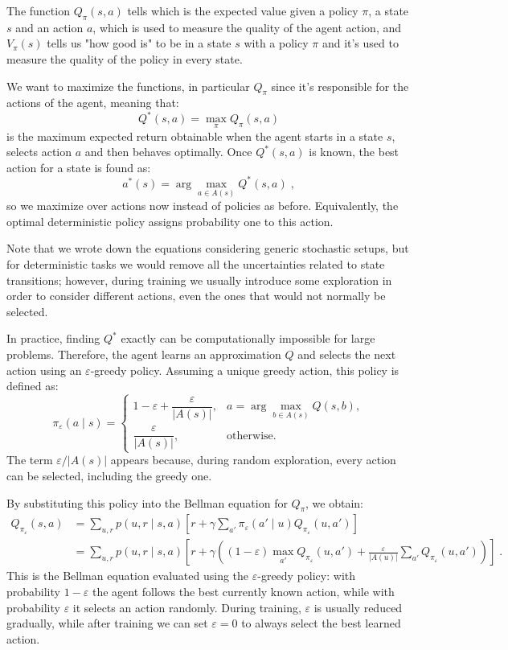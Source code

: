 \documentclass[12pt,a4paper]{article}
\begin{document}
The function $Q_\pi(s,a)$ tells which is the expected value given a policy $\pi$, a state $s$ and an action $a$, which is used to measure the quality of the agent action, and $V_\pi(s)$ tells us "how good is" to be in a state $s$ with a policy $\pi$ and it's used to measure the quality of the policy in every state.

We want to maximize the functions, in particular $Q_\pi$ since it's responsible for the actions of the agent, meaning that:
$$
Q^*(s,a) = \max_{\pi} Q_\pi(s,a)
$$
is the maximum expected return obtainable when the agent starts in a state $s$, selects action $a$ and then behaves optimally. Once $Q^*(s,a)$ is known, the best action for a state is found as:
$$
a^*(s) = \arg \max_{a\in A(s)} Q^*(s,a)\;,
$$
so we maximize over actions now instead of policies as before. Equivalently, the optimal deterministic policy assigns probability one to this action.

Note that we wrote down the equations considering generic stochastic setups, but for deterministic tasks we would remove all the uncertainties related to state transitions; however, during training we usually introduce some exploration in order to consider different actions, even the ones that would not normally be selected.

In practice, finding $Q^*$ exactly can be computationally impossible for large problems. Therefore, the agent learns an approximation $Q$ and selects the next action using an $\varepsilon$-greedy policy. Assuming a unique greedy action, this policy is defined as:
$$
\pi_\varepsilon(a\mid s)=
\begin{cases}
	1-\varepsilon+\dfrac{\varepsilon}{|A(s)|},
	& \displaystyle a=\arg\max_{b\in A(s)}Q(s,b), \\[10pt]
	\dfrac{\varepsilon}{|A(s)|},
	& \text{otherwise}.
\end{cases}
$$
The term $\varepsilon/|A(s)|$ appears because, during random exploration, every action can be selected, including the greedy one.

By substituting this policy into the Bellman equation for $Q_\pi$, we obtain:
\begin{align*}
	Q_{\pi_\varepsilon}(s,a)
	&= \sum_{u,r}p(u,r\mid s,a)
	\left[
	r+\gamma\sum_{a'}\pi_\varepsilon(a'\mid u)
	Q_{\pi_\varepsilon}(u,a')
	\right] \\[8pt]
	&= \sum_{u,r}p(u,r\mid s,a)
	\left[
	r+\gamma\left(
	(1-\varepsilon)\max_{a'}Q_{\pi_\varepsilon}(u,a')
	+\frac{\varepsilon}{|A(u)|}
	\sum_{a'}Q_{\pi_\varepsilon}(u,a')
	\right)
	\right]\;.
\end{align*}
This is the Bellman equation evaluated using the $\varepsilon$-greedy policy: with probability $1-\varepsilon$ the agent follows the best currently known action, while with probability $\varepsilon$ it selects an action randomly. During training, $\varepsilon$ is usually reduced gradually, while after training we can set $\varepsilon=0$ to always select the best learned action.
\end{document}
